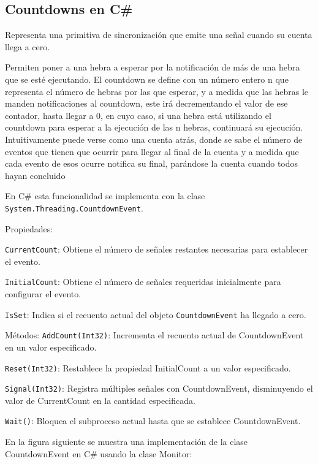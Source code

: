 \documentclass[10pt]{article} %
\newcommand{\csl}[1]{\colorbox{backcolour}{\texttt{#1}}}
\begin{document}
\subsection{Countdowns en C\#}

Representa una primitiva de sincronización que emite una señal cuando su cuenta llega a cero.

Permiten poner a una hebra a esperar por la notificación de más de una hebra que se
esté ejecutando. El countdown se define con un número entero n que representa el número de hebras por
las que esperar, y a medida que las hebras le manden notificaciones al countdown, este irá decrementando el
valor de ese contador, hasta llegar a 0, en cuyo caso, si una hebra está utilizando el countdown para esperar
a la ejecución de las n hebras, continuará su ejecución. Intuitivamente puede verse como una cuenta atrás,
donde se sabe el número de eventos que tienen que ocurrir para llegar al final de la cuenta y a medida que
cada evento de esos ocurre notifica su final, parándose la cuenta cuando todos hayan concluido

En C\# esta funcionalidad se implementa con la clase \csl{System.Threading.CountdownEvent}.

Propiedades:

\csl{CurrentCount}: Obtiene el número de señales restantes necesarias para establecer el evento.

\csl{InitialCount}: Obtiene el número de señales requeridas inicialmente para configurar el evento.

\csl{IsSet}: Indica si el recuento actual del objeto \csl{CountdownEvent} ha llegado a cero.
	
M\'etodos:
\csl{AddCount(Int32)}: Incrementa el recuento actual de CountdownEvent en un valor especificado.

\csl{Reset(Int32)}: Restablece la propiedad InitialCount a un valor especificado.

\csl{Signal(Int32)}: Registra múltiples señales con CountdownEvent, disminuyendo el valor de CurrentCount en la cantidad especificada.

\csl{Wait()}: Bloquea el subproceso actual hasta que se establece CountdownEvent.

En la figura siguiente se muestra una implementación de la clase CountdownEvent en C\# usando la clase Monitor:
\end{document}
